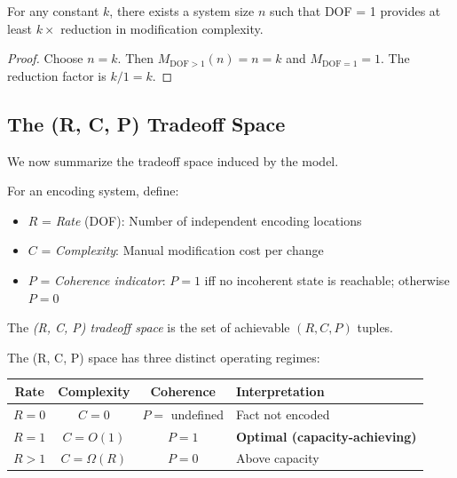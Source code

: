 \begin{corollary}\label{cor:arbitrary-reduction}
For any constant $k$, there exists a system size $n$ such that DOF = 1 provides at least $k\times$ reduction in modification complexity.
\end{corollary}

\begin{proof}
Choose $n = k$. Then $M_{\text{DOF}>1}(n) = n = k$ and $M_{\text{DOF}=1} = 1$. The reduction factor is $k/1 = k$.
\end{proof}

\subsection{The (R, C, P) Tradeoff Space}\label{sec:rcp-tradeoff}

We now summarize the tradeoff space induced by the model.

\begin{definition}[(R, C, P) Tradeoff]\label{def:rcp-tradeoff}
For an encoding system, define:
\begin{itemize}
\tightlist
\item $R$ = \emph{Rate} (DOF): Number of independent encoding locations
\item $C$ = \emph{Complexity}: Manual modification cost per change
\item $P$ = \emph{Coherence indicator}: $P = 1$ iff no incoherent state is reachable; otherwise $P = 0$
\end{itemize}
The \emph{(R, C, P) tradeoff space} is the set of achievable $(R, C, P)$ tuples.
\end{definition}

\begin{theorem}\label{thm:operating-regimes}
The (R, C, P) space has three distinct operating regimes:
\begin{center}
\begin{tabularx}{\linewidth}{cccY}
\toprule
\textbf{Rate} & \textbf{Complexity} & \textbf{Coherence} & \textbf{Interpretation} \\
\midrule
$R = 0$ & $C = 0$ & $P = $ undefined & Fact not encoded \\
$R = 1$ & $C = O(1)$ & $P = 1$ & \textbf{Optimal (capacity-achieving)} \\
$R > 1$ & $C = \Omega(R)$ & $P = 0$ & Above capacity \\
\bottomrule
\end{tabularx}
\end{center}
\end{theorem}

